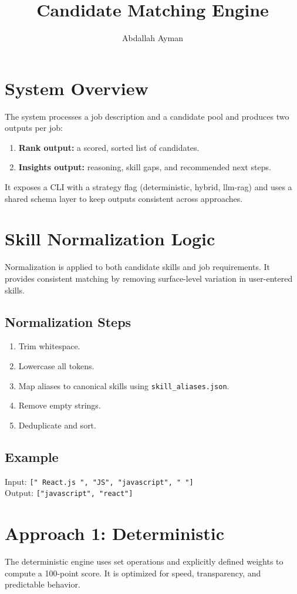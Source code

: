 \documentclass[12pt,a4paper]{article}
\title{\textbf{Candidate Matching Engine}}
\author{Abdallah Ayman}
\begin{document}
\maketitle
\newpage
\tableofcontents
\newpage

\section{System Overview}
The system processes a job description and a candidate pool and produces two outputs per job:
\begin{enumerate}
    \item \textbf{Rank output:} a scored, sorted list of candidates.
    \item \textbf{Insights output:} reasoning, skill gaps, and recommended next steps.
\end{enumerate}
It exposes a CLI with a strategy flag (deterministic, hybrid, llm-rag) and uses a shared schema layer to keep outputs consistent across approaches.

\section{Skill Normalization Logic}
Normalization is applied to both candidate skills and job requirements. It provides consistent matching by removing surface-level variation in user-entered skills.

\subsection{Normalization Steps}
\begin{enumerate}
    \item Trim whitespace.
    \item Lowercase all tokens.
    \item Map aliases to canonical skills using \texttt{skill\_aliases.json}.
    \item Remove empty strings.
    \item Deduplicate and sort.
\end{enumerate}

\subsection{Example}
Input: \texttt{[" React.js ", "JS", "javascript", " "]} \\ 
Output: \texttt{["javascript", "react"]}

\section{Approach 1: Deterministic}
The deterministic engine uses set operations and explicitly defined weights to compute a 100-point score. It is optimized for speed, transparency, and predictable behavior.
\end{document}
